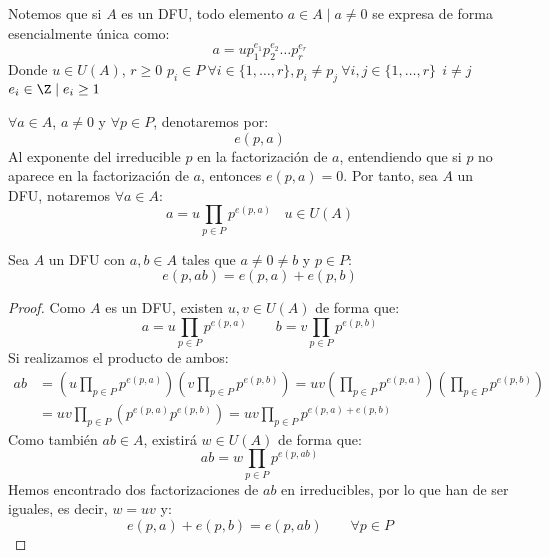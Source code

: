 Notemos que si $A$ es un DFU, todo elemento $a \in A \mid a\neq 0$ se expresa de forma esencialmente única como:
$$a=up_1^{e_1}p_2^{e_2}\ldots p_r^{e_r}$$
Donde $u \in U(A)$, $r\geq 0$\newline
$p_i \in P~\forall i \in \{1, \ldots, r\}, p_i\neq p_j~\forall i,j \in \{1, \ldots, r\}~~i \neq j$\newline
$e_i \in \Z \mid e_i \geq 1$

\begin{notacion}
$\forall a \in A$, $a \neq 0$ y $\forall p \in P$, denotaremos por:
$$e(p,a)$$
Al exponente del irreducible $p$ en la factorización de $a$, entendiendo que si $p$ no aparece en la factorización de $a$,
entonces $e(p,a)=0$. Por tanto, sea $A$ un DFU, notaremos $\forall a \in A$:
$$a = u \prod_{p \in P} p^{e(p,a)}~~~~u \in U(A)$$
\end{notacion}

\begin{lema}
    Sea $A$ un DFU con $a, b \in A$ tales que $a\neq 0\neq b$ y $p \in P$:
    $$e(p,ab) = e(p,a) + e(p,b)$$
\begin{proof}
    Como $A$ es un DFU, existen $u,v\in U(A)$ de forma que:
    \begin{equation*}
        a = u \prod_{p\in P} p^{e(p,a)} \qquad 
        b = v \prod_{p\in P} p^{e(p,b)} 
    \end{equation*}
    Si realizamos el producto de ambos:
    \begin{align*}
        ab &= \left(u \prod_{p\in P} p^{e(p,a)}\right) \left(v \prod_{p\in P} p^{e(p,b)} \right) = uv \left(\prod_{p\in P} p^{e(p,a)}\right)  \left(\prod_{p\in P} p^{e(p,b)}\right) \\
           &= uv \prod_{p\in P} \left(p^{e(p,a)} p^{e(p,b)}\right) = uv \prod_{p\in P} p^{e(p,a) + e(p,b)}
    \end{align*}
    Como también $ab\in A$, existirá $w\in U(A)$ de forma que:
    \begin{equation*}
        ab = w\prod_{p\in P} p^{e(p,ab)}
    \end{equation*}
    Hemos encontrado dos factorizaciones de $ab$ en irreducibles, por lo que han de ser iguales, es decir, $w = uv$ y:
    \begin{equation*}
        e(p,a) + e(p,b) = e(p,ab) \qquad \forall p\in P
    \end{equation*}
\end{proof}
\end{lema}


